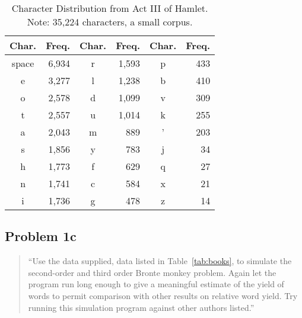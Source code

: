 \documentclass[conference]{IEEEtran}
\begin{document}
\begin{table}
\caption{\hspace{2em}Character Distribution from Act III of Hamlet. \newline
Note: 35,224 characters, a small corpus.\label{tab:hamlet}}
\vspace{-10pt}
\begin{center}
\begin{tabular}{crcrcr}
\hline
Char. & Freq. & Char. & Freq. & Char. & Freq. \\
\hline
space & 6,934  & r     & 1,593  & p     & 433   \\
e     & 3,277  & l     & 1,238  & b     & 410   \\
o     & 2,578  & d     & 1,099  & v     & 309   \\
t     & 2,557  & u     & 1,014  & k     & 255   \\
a     & 2,043  & m     & 889   & '     & 203   \\
s     & 1,856  & y     & 783   & j     & 34    \\
h     & 1,773  & f     & 629   & q     & 27    \\
n     & 1,741  & c     & 584   & x     & 21    \\
i     & 1,736  & g     & 478   & z     & 14    \\
\hline
\end{tabular}
\end{center}
\end{table}

\begin{framed}
\fontsize{5.65}{6.78}\selectfont

\end{framed}


\subsection{Problem 1c}

\begin{quote}
``Use the data supplied, data listed in Table~\ref{tab:books}, to simulate the 
second-order and third order Bronte monkey problem. Again let the program run 
long enough to give a meaningful estimate of the yield of words to permit 
comparison with other results on relative word yield. Try running this 
simulation program against other authors listed.''
\end{quote}
\end{document}
